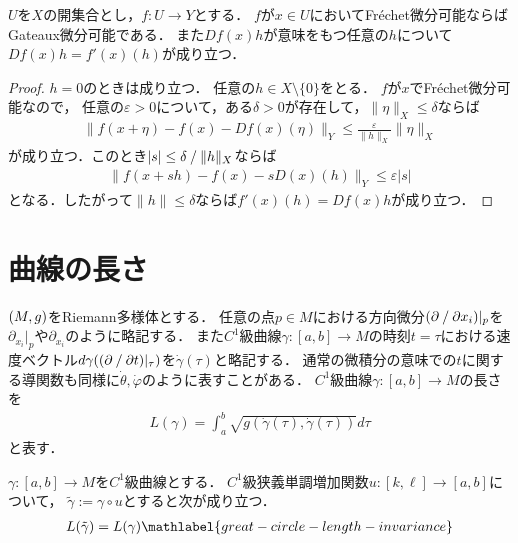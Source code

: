 \documentclass{ltjsarticle}
\begin{document}
\begin{thmbox}
\begin{theorem}
\(U\)を\(X\)の開集合とし，\(f \colon U \to Y\)とする．
\(f\)が\(x \in U\)においてFréchet微分可能ならばGateaux微分可能である．
また\(Df(x)h\)が意味をもつ任意の\(h\)について\(Df(x)h = f'(x)(h)\)が成り立つ．
\end{theorem}
\end{thmbox}

\begin{proof}
\(h = 0\)のときは成り立つ．
任意の\(h \in X \setminus \{0\}\)をとる．
\(f\)が\(x\)でFréchet微分可能なので，
任意の\(\varepsilon > 0\)について，ある\(\delta > 0\)が存在して，\(\lVert \eta \rVert_X \leq \delta\)ならば
\begin{align*}
    \lVert f(x + \eta) - f(x) - Df(x) (\eta) \rVert_Y \leq \frac{\varepsilon}{\lVert h \rVert_X} \lVert \eta \rVert_X
\end{align*}
が成り立つ．このとき\(\lvert s \rvert \leq \delta\mathbin{/}\lVert h \rVert_X\)ならば
\begin{align}
    \lVert f(x + s h) - f(x) - s D(x)(h) \rVert_Y \leq \varepsilon \lvert s \rvert
\end{align}
となる．したがって\(\lVert h \rVert \leq \delta\)ならば\(f'(x)(h) = Df(x)h\)が成り立つ．
\end{proof}

\section{曲線の長さ}

\((M, g)\)をRiemann多様体とする．
任意の点\(p \in M\)における方向微分\((\partial\mathbin{/}\partial x_i)\rvert_p\)を\(\partial_{x_i}\rvert_{p}\)や\(\partial_{x_i}\)のように略記する．
また\(C^1\)級曲線\(\gamma \colon [a, b] \to M\)の時刻\(t = \tau\)における速度ベクトル\(\displaystyle d\gamma((\partial\mathbin{/}\partial t)\rvert_{\tau})\)を\(\dot{\gamma}(\tau)\)と略記する．
通常の微積分の意味での\(t\)に関する導関数も同様に\(\dot{\theta}, \dot{\varphi}\)のように表すことがある．
\(C^1\)級曲線\(\gamma \colon [a, b] \to M\)の長さを
\begin{align*}
    L(\gamma) = \int_{a}^{b} \sqrt{g(\dot{\gamma}(\tau), \dot{\gamma}(\tau))} d\tau
\end{align*}
と表す．

\begin{thmbox}
\begin{proposition}
\(\gamma \colon [a, b] \to M\)を\(C^1\)級曲線とする．
\(C^1\)級狭義単調増加関数\(u \colon [k, \ell] \to [a, b]\)について，
\(\tilde{\gamma} := \gamma \circ u\)とすると次が成り立つ．
\begin{align}
    L(\tilde{\gamma}) = L(\gamma) \mathlabel{great-circle-length-invariance}
\end{align}
\end{proposition}
\end{thmbox}
\end{document}
